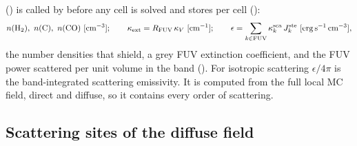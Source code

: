  () is called by
 before any cell is solved and stores per cell
():
\begin{equation}
  n(\mathrm{H_2}),\ n(\mathrm C),\ n(\mathrm{CO})\ [\mathrm{cm^{-3}}];\qquad
  \kappa_{\mathrm{ext}} = \RFUV\,\kappa_V\ [\mathrm{cm^{-1}}];\qquad
  \epsilon = \sum_{k\in\mathrm{FUV}} \kappa^{\mathrm{sca}}_k\,\Jste_k\ [\mathrm{erg\,s^{-1}\,cm^{-3}}],
\end{equation}
the number densities that shield, a grey FUV extinction coefficient, and the
FUV power scattered per unit volume in the band (). For
isotropic scattering $\epsilon/4\pi$ is the band-integrated scattering
emissivity. It is computed from the full local MC field, direct and diffuse,
so it contains every order of scattering.

\subsection{Scattering sites of the diffuse field}
\label{sec:sites}

